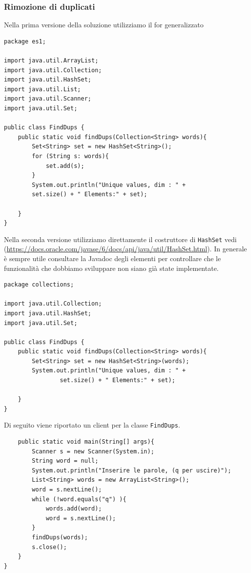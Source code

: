 \documentclass{article}
\begin{document}
\subsubsection{Rimozione di duplicati}

Nella prima versione della soluzione utilizziamo il for generalizzato
\begin{lstlisting}
package es1;

import java.util.ArrayList;
import java.util.Collection;
import java.util.HashSet;
import java.util.List;
import java.util.Scanner;
import java.util.Set;

public class FindDups {
	public static void findDups(Collection<String> words){
		Set<String> set = new HashSet<String>();
		for (String s: words){
			set.add(s);
		}
		System.out.println("Unique values, dim : " + 
		set.size() + " Elements:" + set);
			
	}
}
\end{lstlisting}

Nella seconda versione utilizziamo direttamente il costruttore di \texttt{HashSet} vedi (\url{https://docs.oracle.com/javase/6/docs/api/java/util/HashSet.html}). In generale \`e sempre utile consultare la Javadoc degli elementi per controllare che le funzionalit\`a che dobbiamo sviluppare non siano gi\`a state implementate.
\begin{lstlisting}
package collections;

import java.util.Collection;
import java.util.HashSet;
import java.util.Set;

public class FindDups {
	public static void findDups(Collection<String> words){
		Set<String> set = new HashSet<String>(words);
		System.out.println("Unique values, dim : " + 
				set.size() + " Elements:" + set);
		
	}
}
\end{lstlisting}
Di seguito viene riportato un client per la classe \texttt{FindDups}.
\begin{lstlisting}
	public static void main(String[] args){
		Scanner s = new Scanner(System.in);
		String word = null;
		System.out.println("Inserire le parole, (q per uscire)");
		List<String> words = new ArrayList<String>();
		word = s.nextLine();		
		while (!word.equals("q") ){
			words.add(word);
			word = s.nextLine();
		} 
		findDups(words);
		s.close();
	}
}
\end{lstlisting}
\end{document}
